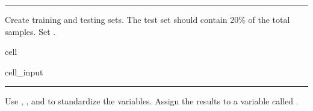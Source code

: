 \documentclass[letterpaper,10pt,english]{sphinxmanual}
\begin{document}
\bigskip\hrule\bigskip


\sphinxAtStartPar
{}

\sphinxAtStartPar
Create training and testing sets. The test set should contain 20\% of the total samples. Set .

\begin{sphinxuseclass}{cell}
\begin{sphinxuseclass}{cell_input}
\begin{sphinxVerbatim}[commandchars=\\\{\}]

              
\end{sphinxVerbatim}

\end{sphinxuseclass}
\end{sphinxuseclass}

\bigskip\hrule\bigskip


\sphinxAtStartPar
{}

\sphinxAtStartPar
Use , , and  to standardize the  variables. Assign the results to a variable called .
\end{document}

